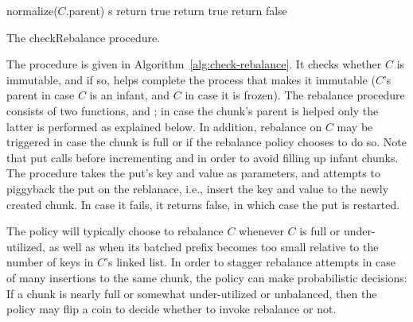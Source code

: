 \begin{algorithm}[tb]
	\begin{algorithmic}[1]{}
			\State normalize($C$.parent)
			\State {} s
			\State return true
		\EndIf
			  \EndIf 
			\State return true
		\EndIf
		\State return false
		\EndProcedure
	\end{algorithmic}
\caption{The checkRebalance procedure.}
\label{alg:check-rebalance}
\end{algorithm}	


The  procedure is given in Algorithm~\ref{alg:check-rebalance}. 
It checks whether $C$ is immutable, and if so, helps complete the process that makes it immutable
($C$'s parent in case $C$ is an infant, and $C$ in case it is frozen).
The rebalance procedure consists of two functions,  and ; in case
the chunk's parent is helped only the latter is performed as explained below.
In addition, rebalance on $C$ may be triggered in case the chunk is full or if the rebalance policy chooses to do so.
Note that put calls  before incrementing  and  in order to avoid filling up infant chunks.
The  procedure takes the put's key and value as parameters, and attempts to piggyback the put on the reblanace, i.e., insert the key and value to the newly created chunk. In case it fails, it returns false, in which case the put is restarted. 

The  policy will typically choose to rebalance $C$ whenever $C$ is full or under-utilized, as well as when
its  batched prefix becomes too small relative to the number of keys in $C$'s linked list.
In order to stagger rebalance attempts in case of many insertions to the same chunk,
the policy can make probabilistic decisions:  If a chunk  is nearly full or somewhat under-utilized or
unbalanced, then the policy may flip a coin to decide whether to invoke rebalance or not.

